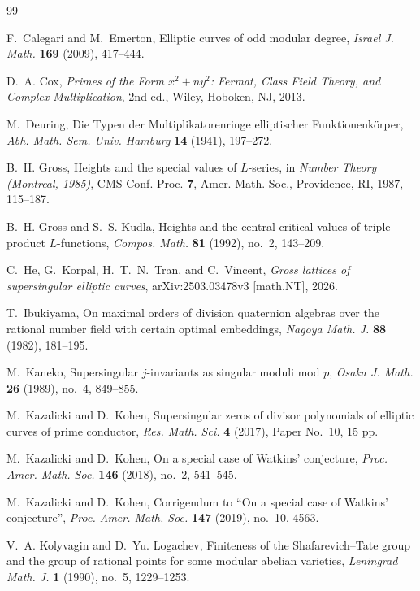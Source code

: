 \documentclass[11pt]{amsart}
\theoremstyle{definition}
\theoremstyle{remark}
\begin{document}
\begin{thebibliography}{99}

F.~Calegari and M.~Emerton,
Elliptic curves of odd modular degree,
\emph{Israel J. Math.} \textbf{169} (2009), 417--444.

D.~A. Cox,
\emph{Primes of the Form $x^2+ny^2$: Fermat, Class Field Theory, and Complex Multiplication},
2nd ed., Wiley, Hoboken, NJ, 2013.

M.~Deuring,
Die Typen der Multiplikatorenringe elliptischer Funktionenk\"orper,
\emph{Abh. Math. Sem. Univ. Hamburg} \textbf{14} (1941), 197--272.

B.~H. Gross,
Heights and the special values of $L$-series,
in \emph{Number Theory (Montreal, 1985)}, CMS Conf. Proc. \textbf{7},
Amer. Math. Soc., Providence, RI, 1987, 115--187.

B.~H. Gross and S.~S. Kudla,
Heights and the central critical values of triple product $L$-functions,
\emph{Compos. Math.} \textbf{81} (1992), no.~2, 143--209.

C.~He, G.~Korpal, H.~T.~N.~Tran, and C.~Vincent,
\emph{Gross lattices of supersingular elliptic curves},
arXiv:2503.03478v3 [math.NT], 2026.

T.~Ibukiyama,
On maximal orders of division quaternion algebras over the rational number field with certain optimal embeddings,
\emph{Nagoya Math. J.} \textbf{88} (1982), 181--195.

M.~Kaneko,
Supersingular $j$-invariants as singular moduli mod $p$,
\emph{Osaka J. Math.} \textbf{26} (1989), no.~4, 849--855.

M.~Kazalicki and D.~Kohen,
Supersingular zeros of divisor polynomials of elliptic curves of prime conductor,
\emph{Res. Math. Sci.} \textbf{4} (2017), Paper No.~10, 15 pp.

M.~Kazalicki and D.~Kohen,
On a special case of Watkins' conjecture,
\emph{Proc. Amer. Math. Soc.} \textbf{146} (2018), no.~2, 541--545.

M.~Kazalicki and D.~Kohen,
Corrigendum to ``On a special case of Watkins' conjecture'',
\emph{Proc. Amer. Math. Soc.} \textbf{147} (2019), no.~10, 4563.

V.~A. Kolyvagin and D.~Yu. Logachev,
Finiteness of the Shafarevich--Tate group and the group of rational points for some modular abelian varieties,
\emph{Leningrad Math. J.} \textbf{1} (1990), no.~5, 1229--1253.



\end{thebibliography}
\end{document}
